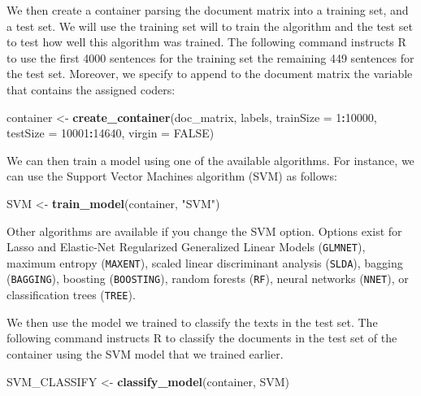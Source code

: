 \documentclass[
]{book}
\newenvironment{Shaded}{\begin{snugshade}}{\end{snugshade}}
\newcommand{\AttributeTok}[1]{\textcolor[rgb]{0.13,0.29,0.53}{#1}}
\newcommand{\ConstantTok}[1]{\textcolor[rgb]{0.56,0.35,0.01}{#1}}
\newcommand{\DecValTok}[1]{\textcolor[rgb]{0.00,0.00,0.81}{#1}}
\newcommand{\FunctionTok}[1]{\textcolor[rgb]{0.13,0.29,0.53}{\textbf{#1}}}
\newcommand{\NormalTok}[1]{#1}
\newcommand{\OtherTok}[1]{\textcolor[rgb]{0.56,0.35,0.01}{#1}}
\newcommand{\SpecialCharTok}[1]{\textcolor[rgb]{0.81,0.36,0.00}{\textbf{#1}}}
\newcommand{\StringTok}[1]{\textcolor[rgb]{0.31,0.60,0.02}{#1}}
\begin{document}
We then create a container parsing the document matrix into a training set, and a test set. We will use the training set will to train the algorithm and the test set to test how well this algorithm was trained. The following command instructs R to use the first 4000 sentences for the training set the remaining 449 sentences for the test set. Moreover, we specify to append to the document matrix the variable that contains the assigned coders:

\begin{Shaded}
\begin{Highlighting}[]
\NormalTok{container }\OtherTok{\textless{}{-}} \FunctionTok{create\_container}\NormalTok{(doc\_matrix,}
\NormalTok{                              labels,}
                              \AttributeTok{trainSize =} \DecValTok{1}\SpecialCharTok{:}\DecValTok{10000}\NormalTok{, }
                              \AttributeTok{testSize =} \DecValTok{10001}\SpecialCharTok{:}\DecValTok{14640}\NormalTok{, }
                              \AttributeTok{virgin =} \ConstantTok{FALSE}\NormalTok{)}
\end{Highlighting}
\end{Shaded}

We can then train a model using one of the available algorithms. For instance, we can use the Support Vector Machines algorithm (SVM) as follows:

\begin{Shaded}
\begin{Highlighting}[]
\NormalTok{SVM }\OtherTok{\textless{}{-}} \FunctionTok{train\_model}\NormalTok{(container, }\StringTok{"SVM"}\NormalTok{)}
\end{Highlighting}
\end{Shaded}

Other algorithms are available if you change the SVM option. Options exist for Lasso and Elastic-Net Regularized Generalized Linear Models (\texttt{GLMNET}), maximum entropy (\texttt{MAXENT}), scaled linear discriminant analysis (\texttt{SLDA}), bagging (\texttt{BAGGING}), boosting (\texttt{BOOSTING}), random forests (\texttt{RF}), neural networks (\texttt{NNET}), or classification trees (\texttt{TREE}).

We then use the model we trained to classify the texts in the test set. The following command instructs R to classify the documents in the test set of the container using the SVM model that we trained earlier.

\begin{Shaded}
\begin{Highlighting}[]
\NormalTok{SVM\_CLASSIFY }\OtherTok{\textless{}{-}} \FunctionTok{classify\_model}\NormalTok{(container, SVM)}
\end{Highlighting}
\end{Shaded}
\end{document}
